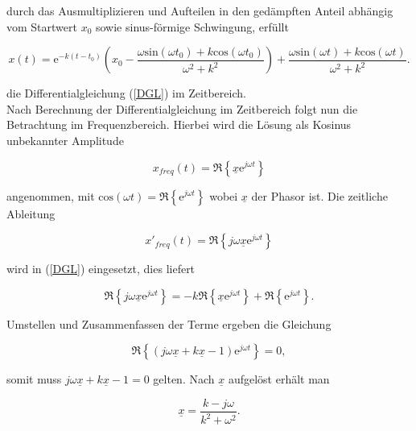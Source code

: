 durch das Ausmultiplizieren und Aufteilen in den gedämpften Anteil abhängig vom Startwert $x_0$ sowie sinus-förmige Schwingung, erfüllt

\begin{equation}
	x(t) = \mathrm{e}^{-k(t-t_0)}\left(x_0-\frac{\omega \mathrm{sin}(\omega t_0)+k\mathrm{cos}(\omega t_0)}{\omega^2+k^2}\right)+\frac{\omega \mathrm{sin}(\omega t)+k\mathrm{cos}(\omega t)}{\omega^2+k^2}.
	\label{allgemeineLösung}
\end{equation}

die Differentialgleichung (\ref{DGL}) im Zeitbereich.\\

Nach Berechnung der Differentialgleichung im Zeitbereich folgt nun die Betrachtung im Frequenzbereich. Hierbei wird die Lösung als Kosinus unbekannter Amplitude

\begin{equation*}
	x_{freq} (t) = \Re \left\{\underline{x}\mathrm{e}^{j\omega t}\right\}
\end{equation*}

angenommen, mit $\mathrm{cos}(\omega t) = \Re\left\{\mathrm{e}^{j\omega t}\right\}$ wobei $\underline{x}$ der Phasor ist. Die zeitliche Ableitung 

\begin{equation*}
	x'_{freq}(t) = \Re \left\{j\omega \underline{x} \mathrm{e}^{j\omega t}\right\}
\end{equation*}

wird in (\ref{DGL}) eingesetzt, dies liefert

\begin{equation*}
	\Re \left\{j\omega \underline{x} \mathrm{e}^{j\omega t}\right\} = -k\Re\left\{\underline{x}\mathrm{e}^{j\omega t}\right\} + \Re\left\{\mathrm{e}^{j\omega t}\right\}.
\end{equation*}

Umstellen und Zusammenfassen der Terme ergeben die Gleichung

\begin{equation*}
	\Re \left\{(j\omega \underline{x} + k\underline{x} - 1)\mathrm{e}^{j\omega t}\right\} = 0,
\end{equation*}

somit muss $j\omega \underline{x} + k\underline{x} - 1 = 0$ gelten. Nach $\underline{x}$ aufgelöst erhält man 

\begin{equation*}
	\underline{x} = \frac{k-j\omega}{k^2+\omega^2}.
\end{equation*}

